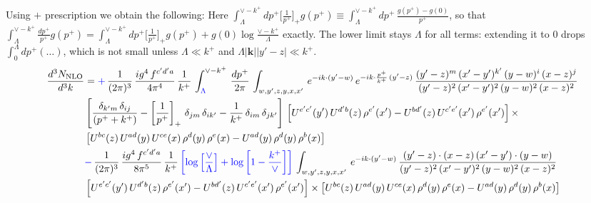 \documentclass[9pt]{article}
\numberwithin{equation}{section}
\begin{document}
Using $+$ prescription we obtain the following: {\color{blue}Here $\int_{\Lambda}^{\vee-k^{+}}dp^{+}\big[\frac{1}{p^{+}}\big]_{+}g(p^{+})\equiv\int_{\Lambda}^{\vee-k^{+}}dp^{+}\,\frac{g(p^{+})-g(0)}{p^{+}}$, so that $\int_{\Lambda}^{\vee-k^{+}}\frac{dp^{+}}{p^{+}}g(p^{+})=\int_{\Lambda}^{\vee-k^{+}}dp^{+}\big[\frac{1}{p^{+}}\big]_{+}g(p^{+})+g(0)\log\frac{\vee-k^{+}}{\Lambda}$ exactly. The lower limit stays $\Lambda$ for all terms: extending it to $0$ drops $\int_0^\Lambda dp^+(\dots)$, which is not small unless $\Lambda\ll k^+$ and $\Lambda|\mathbf k||y'-z|\ll k^+$.}
\begin{align}
    \frac{d^{3}N_{\rm NLO}}{d^{3}k} & = {\color{blue}+}\,\frac{1}{(2\pi)^{3}}\, \frac{ig^{4}\,f^{c'd'a}}{4\pi^{4}}\, \frac{1}{k^{+}}\,\int_{{\color{blue}\Lambda}}^{\vee-k^{+}}\, \frac{dp^{+}}{2\pi}\, \int_{w,y',z,y,x,x'}\, e^{-ik\cdot (y'-w)}\, e^{-ik\cdot \frac{p^{+}}{k^{+}}\,(y'-z)}\,\frac{(y'-z)^{m}\,(x'-y')^{k'}\,(y-w)^{i}\,(x-z)^{j}}{(y'-z)^{2}\,(x'-y')^{2}\,(y-w)^{2}\,(x-z)^{2}}\notag \\ & \left[\frac{\delta_{k'm}\,\delta_{ij}}{(p^{+}+k^{+})}-\left[\frac{1}{p^{+}}\right]_{+}\,\delta_{jm}\,\delta_{ik'}-\frac{1}{k^{+}}\, \delta_{im}\, \delta_{jk'}\right]\, \left[U^{e'c'}(y')\,U^{d'b}(z)\,\rho^{e'}(x')-U^{bd'}(z)\,U^{c'e'}(x')\,\rho^{e'}(x')\right]\times\notag \\ &  \left[U^{bc}(z)\,U^{ad}(y)\,U^{ce}(x)\,\rho^{d}(y)\,\rho^{e}(x)-U^{ad}(y)\,\rho^{d}(y)\,\rho^{b}(x)\right]\notag \\ &  {\color{blue}-}\,\frac{1}{(2\pi)^{3}}\, \frac{ig^{4}\,f^{c'd'a}}{8\pi^{5}}\, \frac{1}{k^{+}}\,{\color{blue}\left[\log{\left[\frac{\vee}{\Lambda}\right]} + \log{\left[1-\frac{k^{+}}{\vee}\right]}\right]}\, \int_{w,y',z,y,x,x'}\, e^{-ik\cdot (y'-w)}\,\frac{(y'-z)\cdot (x-z)\,(x'-y')\cdot (y-w)}{(y'-z)^{2}\,(x'-y')^{2}\,(y-w)^{2}\,(x-z)^{2}}\notag \\ & \left[U^{e'c'}(y')\,U^{d'b}(z)\,\rho^{e'}(x')-U^{bd'}(z)\,U^{c'e'}(x')\,\rho^{e'}(x')\right]\times  \left[U^{bc}(z)\,U^{ad}(y)\,U^{ce}(x)\,\rho^{d}(y)\,\rho^{e}(x)-U^{ad}(y)\,\rho^{d}(y)\,\rho^{b}(x)\right]
\end{align}
\end{document}
